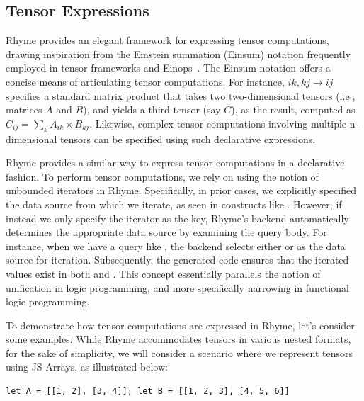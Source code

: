 \documentclass[runningheads]{llncs}
\newcommand{\lang}{Rhyme}
\begin{document}



\vspace{-4mm}
\subsection{Tensor Expressions}\label{subsec:tensor}
\vspace{-2mm}
\lang{} provides an elegant framework for expressing tensor computations,
drawing inspiration from the Einstein summation (Einsum) notation frequently
employed in tensor frameworks and Einops~\cite{einops}.
The Einsum notation offers a concise means of articulating tensor computations.
For instance, $ik,kj \rightarrow ij$ specifies a standard matrix
product that takes two two-dimensional tensors (i.e., matrices $A$ and $B$), and yields a third
tensor (say $C$), as the result, computed as $C_{ij} = \sum_k A_{ik} \times B_{kj}$.
Likewise, complex tensor computations involving multiple n-dimensional tensors can
be specified using such declarative expressions.

\lang{} provides a similar way to express tensor computations in a declarative fashion.
To perform tensor computations, we rely on using the notion of unbounded iterators in \lang{}.
Specifically, in prior cases, we explicitly specified the data source from which we iterate,
as seen in constructs like .
However, if instead we only specify the iterator as the key, \lang{}'s backend
automatically determines the appropriate data source by examining the query body.
For instance, when we have a query like , the
backend selects either  or  as the data source for iteration.
Subsequently, the generated code ensures that the iterated values exist in
both  and .
This concept essentially parallels the notion of unification in logic programming,
and more specifically narrowing in functional logic programming\cite{curry,verse}.

To demonstrate how tensor computations are expressed in \lang{}, let's consider
some examples.
While \lang{} accommodates tensors in various nested formats, for the sake of simplicity,
we will consider a scenario where we represent tensors using JS Arrays, as illustrated below:
\begin{lstlisting}[style=JavaScript,columns=flexible]
let A = [[1, 2], [3, 4]]; let B = [[1, 2, 3], [4, 5, 6]]
\end{lstlisting}
\end{document}
